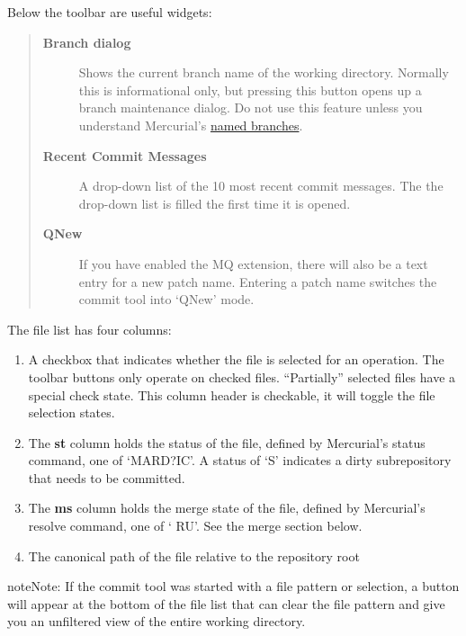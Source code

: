 \documentclass[letterpaper,10pt,english]{manual}
\begin{document}
Below the toolbar are useful widgets:
\begin{quote}
\begin{description}
\item[\textbf{Branch dialog}]
Shows the current branch name of the working directory. Normally
this is informational only, but pressing this button opens up a
branch maintenance dialog.  Do not use this feature unless you
understand Mercurial's
\href{http://mercurial.selenic.com/wiki/NamedBranches}{named branches}.

\item[\textbf{Recent Commit Messages}]
A drop-down list of the 10 most recent commit messages. The
the drop-down list is filled the first time it is opened.

\item[\textbf{QNew}]
If you have enabled the MQ extension, there will also be a text
entry for a new patch name.  Entering a patch name switches the
commit tool into `QNew' mode.

\end{description}
\end{quote}

The file list has four columns:
\begin{enumerate}
\item {} 
A checkbox that indicates whether the file is selected for an
operation.  The toolbar buttons only operate on checked files.
``Partially'' selected files have a special check state.  This
column header is checkable, it will toggle the file selection
states.

\item {} 
The \textbf{st} column holds the status of the file, defined
by Mercurial's status command, one of `MARD?IC'.  A status of `S'
indicates a dirty subrepository that needs to be committed.

\item {} 
The \textbf{ms} column holds the merge state of the file,
defined by Mercurial's resolve command, one of ` RU'.  See the
merge section below.

\item {} 
The canonical path of the file relative to the repository root

\end{enumerate}

\begin{notice}{note}{Note:}
If the commit tool was started with a file pattern or selection, a
button will appear at the bottom of the file list that can clear the
file pattern and give you an unfiltered view of the entire working
directory.
\end{notice}
\end{document}
